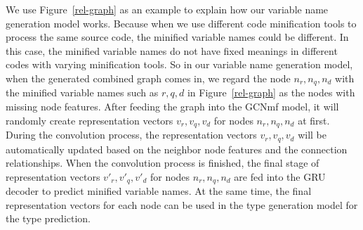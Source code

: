 We use Figure~\ref{rel-graph} as an example to explain how our
variable name generation model works. Because when we use different
code minification tools to process the same source code, the minified
variable names could be different. In this case, the minified variable
names do not have fixed meanings in different codes with varying
minification tools. So in our variable name generation model, when the
generated combined graph comes in, we regard the node $n_r, n_q, n_d$
with the minified variable names such as $r, q, d$ in
Figure~\ref{rel-graph} as the nodes with missing node features. After
feeding the graph into the GCNmf model, it will randomly create
representation vectors $v_r, v_q, v_d$ for nodes $n_r, n_q, n_d$ at
first. During the convolution process, the representation vectors
$v_r, v_q, v_d$ will be automatically updated based on the neighbor
node features and the connection relationships. When the convolution
process is finished, the final stage of representation vectors $v'_r,
v'_q, v'_d$ for nodes $n_r, n_q, n_d$ are fed into the GRU decoder to
predict minified variable names. At the same time, the final
representation vectors for each node can be used in the type
generation model for the type prediction.
